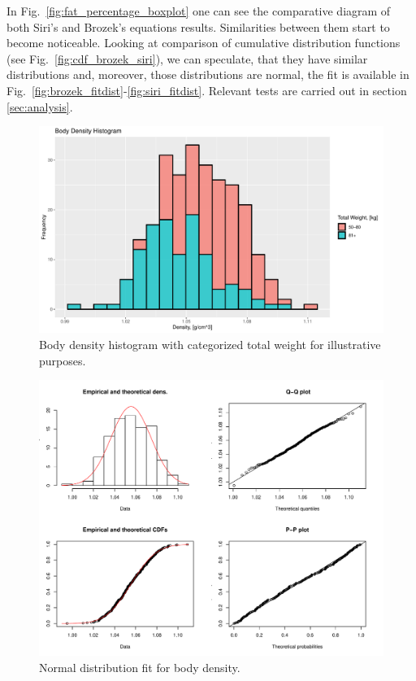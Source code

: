 \documentclass[11pt,american,american]{article}
\begin{document}
\medskip

In Fig.~\ref{fig:fat_percentage_boxplot} one can see the comparative diagram of both Siri's and Brozek's equations results. Similarities between them start to become noticeable. Looking at comparison of cumulative distribution functions (see Fig.~\ref{fig:cdf_brozek_siri}), we can speculate, that they have similar distributions and, moreover, those distributions are normal, the fit is available in Fig.~\ref{fig:brozek_fitdist}-\ref{fig:siri_fitdist}. Relevant tests are carried out in section \ref{sec:analysis}.

\newpage

\vspace*{\fill}
\begin{figure}[H]
	\centering
	\includegraphics[width=0.75\linewidth]{Images/FIGURES/body_density_histogram}
	\caption{Body density histogram with categorized total weight for illustrative purposes.}
	\label{fig:body_density_histogram}
\end{figure}

\begin{figure}[H]
	\centering
	\includegraphics[width=0.8\linewidth]{Images/FIGURES/density_fitdist}
	\caption{Normal distribution fit for body density.}
	\label{fig:density_fitdist}
\end{figure}
\vspace*{\fill}
\end{document}

